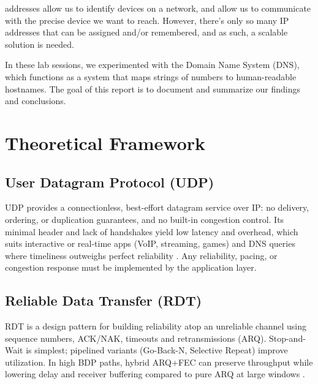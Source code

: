 % 
% 
% 
% 
 addresses allow us to identify devices on a network,
and allow us to communicate with the precise device we want to reach.
However, there's only so many IP addresses that can be assigned and/or remembered, and as such,
a scalable solution is needed.

In these lab sessions, we experimented with the Domain Name System (DNS), which
functions as a system that maps strings of numbers to human-readable hostnames.
The goal of this report is to document and summarize our findings and
conclusions.



\section{Theoretical Framework}

\subsection{User Datagram Protocol (UDP)}
UDP provides a connectionless, best-effort datagram service over IP: no delivery, ordering, or duplication guarantees, and no built-in congestion control. Its minimal header and lack of handshakes yield low latency and overhead, which suits interactive or real-time apps (VoIP, streaming, games) and DNS queries where timeliness outweighs perfect reliability \cite{rfc768,kurose:topdown8e}. Any reliability, pacing, or congestion response must be implemented by the application layer.

\subsection{Reliable Data Transfer (RDT)}
RDT is a design pattern for building reliability atop an unreliable channel using sequence numbers, ACK/NAK, timeouts and retransmissions (ARQ). Stop-and-Wait is simplest; pipelined variants (Go-Back-N, Selective Repeat) improve utilization. In high BDP paths, hybrid ARQ+FEC can preserve throughput while lowering delay and receiver buffering compared to pure ARQ at large windows \cite{kurose:topdown8e,ghaderi2013scalablerdt}.

